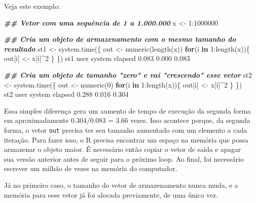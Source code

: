\documentclass[
  10pt,
  a4paper]{book}
\newenvironment{Shaded}{\begin{snugshade}}{\end{snugshade}}
\newcommand{\ControlFlowTok}[1]{\textcolor[rgb]{0.13,0.29,0.53}{\textbf{#1}}}
\newcommand{\DecValTok}[1]{\textcolor[rgb]{0.00,0.00,0.81}{#1}}
\newcommand{\DocumentationTok}[1]{\textcolor[rgb]{0.56,0.35,0.01}{\textbf{\textit{#1}}}}
\newcommand{\FloatTok}[1]{\textcolor[rgb]{0.00,0.00,0.81}{#1}}
\newcommand{\FunctionTok}[1]{\textcolor[rgb]{0.00,0.00,0.00}{#1}}
\newcommand{\NormalTok}[1]{#1}
\newcommand{\OtherTok}[1]{\textcolor[rgb]{0.56,0.35,0.01}{#1}}
\newcommand{\SpecialCharTok}[1]{\textcolor[rgb]{0.00,0.00,0.00}{#1}}
\begin{document}
Veja este exemplo:

\begin{Shaded}
\begin{Highlighting}[]
\DocumentationTok{\#\# Vetor com uma sequência de 1 a 1.000.000}
\NormalTok{x }\OtherTok{\textless{}{-}} \DecValTok{1}\SpecialCharTok{:}\DecValTok{1000000}

\DocumentationTok{\#\# Cria um objeto de armazenamento com o mesmo tamanho do resultado}
\NormalTok{st1 }\OtherTok{\textless{}{-}} \FunctionTok{system.time}\NormalTok{(\{}
\NormalTok{    out }\OtherTok{\textless{}{-}} \FunctionTok{numeric}\NormalTok{(}\FunctionTok{length}\NormalTok{(x))}
    \ControlFlowTok{for}\NormalTok{(i }\ControlFlowTok{in} \DecValTok{1}\SpecialCharTok{:}\FunctionTok{length}\NormalTok{(x))\{}
\NormalTok{        out[i] }\OtherTok{\textless{}{-}}\NormalTok{ x[i]}\SpecialCharTok{\^{}}\DecValTok{2}
\NormalTok{    \}}
\NormalTok{\})}
\NormalTok{st1}
\NormalTok{   user  system elapsed }
  \FloatTok{0.083}   \FloatTok{0.000}   \FloatTok{0.083} 

\DocumentationTok{\#\# Cria um objeto de tamanho "zero" e vai "crescendo" esse vetor}
\NormalTok{st2 }\OtherTok{\textless{}{-}} \FunctionTok{system.time}\NormalTok{(\{}
\NormalTok{    out }\OtherTok{\textless{}{-}} \FunctionTok{numeric}\NormalTok{(}\DecValTok{0}\NormalTok{)}
    \ControlFlowTok{for}\NormalTok{(i }\ControlFlowTok{in} \DecValTok{1}\SpecialCharTok{:}\FunctionTok{length}\NormalTok{(x))\{}
\NormalTok{        out[i] }\OtherTok{\textless{}{-}}\NormalTok{ x[i]}\SpecialCharTok{\^{}}\DecValTok{2}
\NormalTok{    \}}
\NormalTok{\})}
\NormalTok{st2}
\NormalTok{   user  system elapsed }
  \FloatTok{0.288}   \FloatTok{0.016}   \FloatTok{0.304} 
\end{Highlighting}
\end{Shaded}

Essa simples diferença gera um aumento de tempo de execução da segunda
forma em aproximadamente
0.304/0.083 = 3.66 vezes. Isso acontece
porque, da segunda forma, o vetor \texttt{out} precisa ter seu tamanho
aumentado com um elemento a cada iteração. Para fazer isso, o R precisa
encontrar um espaço na memória que possa armazenar o objeto maior. É
necessário então copiar o vetor de saída e apagar sua versão anterior
antes de seguir para o próximo loop. Ao final, foi necessário escrever
um milhão de vezes na memória do computador.

Já no primeiro caso, o tamanho do vetor de armazenamento nunca muda, e a
memória para esse vetor já foi alocada previamente, de uma única vez.
\end{document}
